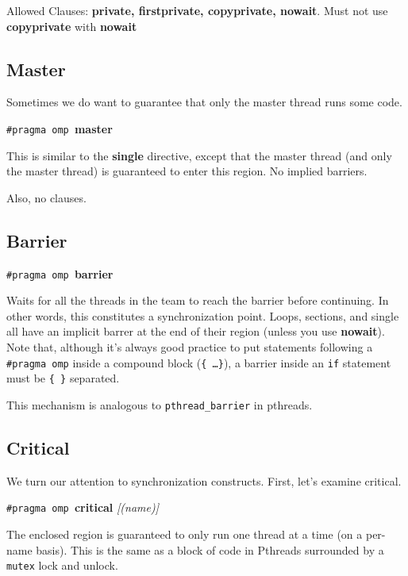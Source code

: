  Allowed Clauses: {\bf private, firstprivate, copyprivate, nowait}.
 Must not use {\bf copyprivate} with {\bf nowait}


  \subsection*{Master} Sometimes we do want to guarantee that only the master
thread runs some code.
  \begin{center}
    {\tt \#pragma omp }{\bf master}
  \end{center}

    This is similar to the {\bf single} directive, except that the master thread (and only the master thread) is guaranteed to enter this region.
    No implied barriers. 

Also, no clauses.

 \subsection*{Barrier}

  \begin{center}
    {\tt \#pragma omp }{\bf barrier}
  \end{center}

     Waits for all the threads in the team to reach the barrier before
      continuing. In other words, this constitutes a synchronization point.
     Loops, sections, and single all have an implicit barrer at the end of their
      region (unless you use {\bf nowait}).
     Note that, although it's always good practice to put statements following a {\tt \#pragma omp} inside a compound block ({\tt \{ \ldots \}}), a barrier inside an {\tt if} statement must be {\tt \{  \}} separated.

     This mechanism is analogous to {\tt pthread\_barrier} in pthreads.

  \subsection*{Critical} We turn our attention to synchronization constructs.
First, let's examine critical.
  \begin{center}
    {\tt \#pragma omp }{\bf critical} {\it [(name)]}
  \end{center}

    The enclosed region is guaranteed to only run one thread at a time
      (on a per-name basis).
    This is the same as a block of code in Pthreads surrounded by a {\tt mutex} lock
      and unlock.

